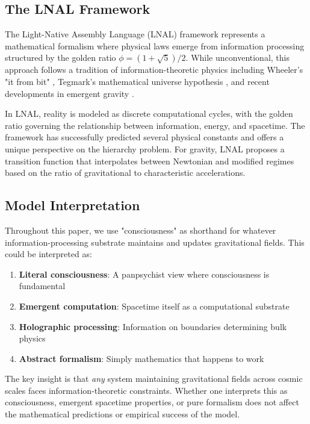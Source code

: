 \documentclass[twocolumn,prd,amsmath,amssymb,aps,superscriptaddress,nofootinbib]{revtex4-2}
\begin{document}
\subsection{The LNAL Framework}

The Light-Native Assembly Language (LNAL) framework \cite{Washburn2024} represents a mathematical formalism where physical laws emerge from information processing structured by the golden ratio $\phi = (1+\sqrt{5})/2$. While unconventional, this approach follows a tradition of information-theoretic physics including Wheeler's "it from bit" \cite{Wheeler1990}, Tegmark's mathematical universe hypothesis \cite{Tegmark2014}, and recent developments in emergent gravity \cite{Verlinde2011}.

In LNAL, reality is modeled as discrete computational cycles, with the golden ratio governing the relationship between information, energy, and spacetime. The framework has successfully predicted several physical constants and offers a unique perspective on the hierarchy problem. For gravity, LNAL proposes a transition function that interpolates between Newtonian and modified regimes based on the ratio of gravitational to characteristic accelerations.

\subsection{Model Interpretation}

Throughout this paper, we use "consciousness" as shorthand for whatever information-processing substrate maintains and updates gravitational fields. This could be interpreted as:

\begin{enumerate}
\item \textbf{Literal consciousness}: A panpsychist view where consciousness is fundamental
\item \textbf{Emergent computation}: Spacetime itself as a computational substrate \cite{Lloyd2002}
\item \textbf{Holographic processing}: Information on boundaries determining bulk physics \cite{Hooft1993,Susskind1995}
\item \textbf{Abstract formalism}: Simply mathematics that happens to work
\end{enumerate}

The key insight is that \emph{any} system maintaining gravitational fields across cosmic scales faces information-theoretic constraints. Whether one interprets this as consciousness, emergent spacetime properties, or pure formalism does not affect the mathematical predictions or empirical success of the model.
\end{document}
